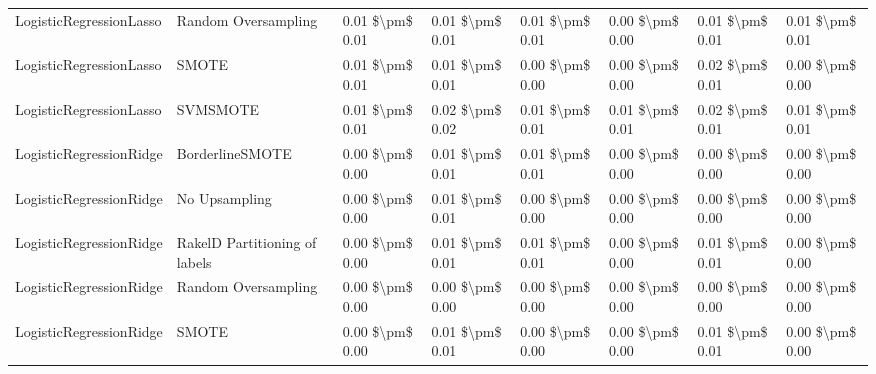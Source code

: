 \begin{tabular}{llllllll}
        LogisticRegressionLasso &           Random Oversampling & 0.01 \$\textbackslash pm\$ 0.01 &           0.01 \$\textbackslash pm\$ 0.01 &       0.01 \$\textbackslash pm\$ 0.01 &        0.00 \$\textbackslash pm\$ 0.00 &                         0.01 \$\textbackslash pm\$ 0.01 &     0.01 \$\textbackslash pm\$ 0.01 \\
        LogisticRegressionLasso &                         SMOTE & 0.01 \$\textbackslash pm\$ 0.01 &           0.01 \$\textbackslash pm\$ 0.01 &       0.00 \$\textbackslash pm\$ 0.00 &        0.00 \$\textbackslash pm\$ 0.00 &                         0.02 \$\textbackslash pm\$ 0.01 &     0.00 \$\textbackslash pm\$ 0.00 \\
        LogisticRegressionLasso &                      SVMSMOTE & 0.01 \$\textbackslash pm\$ 0.01 &           0.02 \$\textbackslash pm\$ 0.02 &       0.01 \$\textbackslash pm\$ 0.01 &        0.01 \$\textbackslash pm\$ 0.01 &                         0.02 \$\textbackslash pm\$ 0.01 &     0.01 \$\textbackslash pm\$ 0.01 \\
        LogisticRegressionRidge &               BorderlineSMOTE & 0.00 \$\textbackslash pm\$ 0.00 &           0.01 \$\textbackslash pm\$ 0.01 &       0.01 \$\textbackslash pm\$ 0.01 &        0.00 \$\textbackslash pm\$ 0.00 &                         0.00 \$\textbackslash pm\$ 0.00 &     0.00 \$\textbackslash pm\$ 0.00 \\
        LogisticRegressionRidge &                 No Upsampling & 0.00 \$\textbackslash pm\$ 0.00 &           0.01 \$\textbackslash pm\$ 0.01 &       0.00 \$\textbackslash pm\$ 0.00 &        0.00 \$\textbackslash pm\$ 0.00 &                         0.00 \$\textbackslash pm\$ 0.00 &     0.00 \$\textbackslash pm\$ 0.00 \\
        LogisticRegressionRidge & RakelD Partitioning of labels & 0.00 \$\textbackslash pm\$ 0.00 &           0.01 \$\textbackslash pm\$ 0.01 &       0.01 \$\textbackslash pm\$ 0.01 &        0.00 \$\textbackslash pm\$ 0.00 &                         0.01 \$\textbackslash pm\$ 0.01 &     0.00 \$\textbackslash pm\$ 0.00 \\
        LogisticRegressionRidge &           Random Oversampling & 0.00 \$\textbackslash pm\$ 0.00 &           0.00 \$\textbackslash pm\$ 0.00 &       0.00 \$\textbackslash pm\$ 0.00 &        0.00 \$\textbackslash pm\$ 0.00 &                         0.00 \$\textbackslash pm\$ 0.00 &     0.00 \$\textbackslash pm\$ 0.00 \\
        LogisticRegressionRidge &                         SMOTE & 0.00 \$\textbackslash pm\$ 0.00 &           0.01 \$\textbackslash pm\$ 0.01 &       0.00 \$\textbackslash pm\$ 0.00 &        0.00 \$\textbackslash pm\$ 0.00 &                         0.01 \$\textbackslash pm\$ 0.01 &     0.00 \$\textbackslash pm\$ 0.00 \\

\end{tabular}
